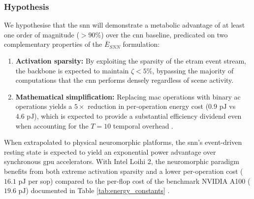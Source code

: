 \subsubsection{Hypothesis}
\label{subsubsec:energy_hypothesis}

We hypothesise that the \gls{snn} will demonstrate a metabolic advantage of at 
least one order of magnitude ($>90\%$) over the \gls{cnn} baseline, predicated 
on two complementary properties of the $\bar{E}_{SNN}$ formulation:

\begin{enumerate}

    \item \textbf{Activation sparsity:} By exploiting the sparsity of the 
    \gls{etram} event stream, the backbone is expected to maintain $\zeta < 5\%$, 
    bypassing the majority of computations that the \gls{cnn} performs densely 
    regardless of scene activity.


    \item \textbf{Mathematical simplification:} Replacing \gls{mac} operations 
    with binary \gls{ac} operations yields a $5\times$ reduction in per-operation 
    energy cost ($0.9\text{ pJ}$ vs $4.6\text{ pJ}$), which is expected to 
    provide a substantial efficiency dividend even when accounting for the $T=10$ 
    temporal overhead \cite{horowitz20141}.

\end{enumerate}

When extrapolated to physical neuromorphic platforms, the \gls{snn}'s event-driven 
resting state is expected to yield an exponential power advantage over synchronous \gls{gpu} 
accelerators. With Intel Loihi 2, the neuromorphic paradigm benefits from 
both extreme activation sparsity and a lower per-operation cost ($16.1\text{ pJ}$ 
per \gls{sop}) compared to the per-\gls{flop} cost of the benchmark NVIDIA A100 ($19.6\text{ pJ}$) 
documented in Table \ref{tab:energy_constants} \cite{gralewicz2024spikes, merolla2014million, a100_usage}.
